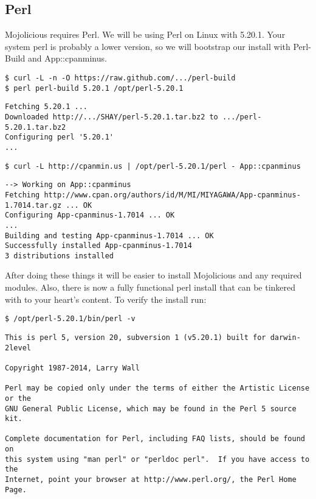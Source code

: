 \documentclass[14pt]{extreport}
\begin{document}
\subsection{Perl}

Mojolicious requires Perl.  We will be using Perl on Linux with 5.20.1.  Your
system perl is probably a lower version, so we will bootstrap our install with 
Perl-Build and App::cpanminus.

\begin{lstlisting}[style=BashInputStyle]
$ curl -L -n -O https://raw.github.com/.../perl-build
$ perl perl-build 5.20.1 /opt/perl-5.20.1
\end{lstlisting}

\begin{lstlisting}[style=BashOutputStyle]
Fetching 5.20.1 ...
Downloaded http://.../SHAY/perl-5.20.1.tar.bz2 to .../perl-5.20.1.tar.bz2
Configuring perl '5.20.1'
...
\end{lstlisting}

\begin{lstlisting}[style=BashInputStyle]
$ curl -L http://cpanmin.us | /opt/perl-5.20.1/perl - App::cpanminus
\end{lstlisting}

\begin{lstlisting}[style=BashOutputStyle]
--> Working on App::cpanminus
Fetching http://www.cpan.org/authors/id/M/MI/MIYAGAWA/App-cpanminus-1.7014.tar.gz ... OK
Configuring App-cpanminus-1.7014 ... OK
...
Building and testing App-cpanminus-1.7014 ... OK
Successfully installed App-cpanminus-1.7014
3 distributions installed
\end{lstlisting}

After doing these things it will be easier to install Mojolicious and any required modules.
Also, there is now a fully functional perl install that can be tinkered with to your heart's content.
To verify the install run:

\begin{lstlisting}[style=BashInputStyle]
$ /opt/perl-5.20.1/bin/perl -v
\end{lstlisting}

\begin{lstlisting}[style=BashOutputStyle]
This is perl 5, version 20, subversion 1 (v5.20.1) built for darwin-2level

Copyright 1987-2014, Larry Wall

Perl may be copied only under the terms of either the Artistic License or the
GNU General Public License, which may be found in the Perl 5 source kit.

Complete documentation for Perl, including FAQ lists, should be found on
this system using "man perl" or "perldoc perl".  If you have access to the
Internet, point your browser at http://www.perl.org/, the Perl Home Page.
\end{lstlisting}
\end{document}
